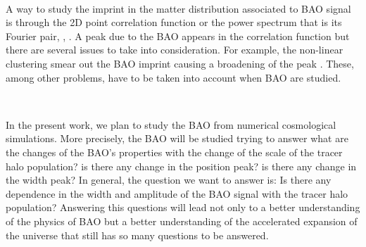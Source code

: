 \	

A way to study the imprint in the matter distribution associated  to BAO signal is through the 2D point correlation function or the power spectrum that is its Fourier pair, \cite{PLOT}, \cite{PLOT2}.  
A peak due to the BAO appears in the correlation function but there are 
several issues to take into consideration.
For example, the non-linear clustering smear out the BAO imprint causing a broadening of the peak \cite{Shift01}. These, among other problems, have to be taken into account when BAO are studied. 

\

In the present work, we plan to study the BAO from numerical cosmological simulations. 
More precisely, the BAO will be studied trying to answer what are the changes of 
the BAO's properties with the change of the scale of the tracer halo population?
is there any change in the position peak? is there any change in the width peak? 
In general, the question we want to answer is: Is there any dependence in the width 
and amplitude of the BAO signal with the tracer halo population?
Answering this questions will lead not only to a better understanding of the physics of
BAO but a better understanding of the accelerated expansion of the universe that still has so many questions to be answered. 


